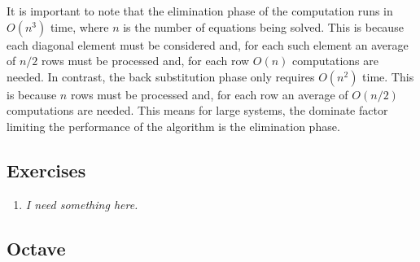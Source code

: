 It is important to note that the elimination phase of the computation runs in $O(n^3)$ time,
where $n$ is the number of equations being solved. This is because each diagonal element must be
considered and, for each such element an average of $n/2$ rows must be processed and, for each
row $O(n)$ computations are needed. In contrast, the back substitution phase only requires
$O(n^2)$ time. This is because $n$ rows must be processed and, for each row an average of
$O(n/2)$ computations are needed. This means for large systems, the dominate factor limiting the
performance of the algorithm is the elimination phase.

\subsection*{Exercises}

\begin{enumerate}

\item \emph{I need something here.}

\end{enumerate}

\subsection*{Octave}
